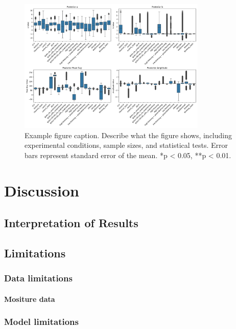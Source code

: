\documentclass[12pt,a4paper]{article}
\begin{document}
\begin{figure}[H]
    \centering
    \includegraphics[width=0.8\textwidth]{"../other_params.png"}
    \caption{Example figure caption. Describe what the figure shows, including experimental conditions, sample sizes, and statistical tests. Error bars represent standard error of the mean. *p < 0.05, **p < 0.01.}
    \label{fig:other_params}
\end{figure}



\section{Discussion}

\subsection{Interpretation of Results}


\subsection{Limitations}

\subsubsection{Data limitations}

\paragraph{Mositure data}



\subsubsection{Model limitations}
\end{document}
